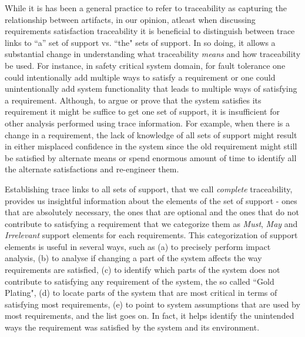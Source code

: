 While it is has been a general practice to refer to traceability as capturing the relationship between artifacts, in our opinion, atleast when discussing requirements satisfaction traceability it is beneficial to distinguish between trace links to ``a'' set of support vs. ``the" sets of support. In so doing, it allows a substantial change in understanding what traceability {\em means} and how traceability be used. For instance, in safety critical system domain, for fault tolerance one could intentionally add multiple ways to satisfy a requirement or one could unintentionally add system functionality that leads to multiple ways of satisfying a requirement. Although, to argue or prove that the system satisfies its requirement it might be suffice to get one set of support, it is insufficient for other analysis performed using trace information. For example, when there is a change in a requirement, the lack of knowledge of all sets of support might result in either misplaced confidence in the system since the old requirement might still be satisfied by alternate means or spend enormous amount of time to identify all the alternate satisfactions and re-engineer them. 

Establishing trace links to all sets of support, that we call \emph{complete} traceability, provides us insightful information about the elements of the set of support - ones that are absolutely necessary, the ones that are optional and the ones that do not contribute to satisfying a requirement that we categorize them as \emph{Must}, \emph{May} and \emph{Irrelevant} support elements for each requirements. This categorization of support elements is useful in several ways, such as (a) to precisely perform impact analysis, (b) to analyse if changing a part of the system affects the way requirements are satisfied, (c) to identify which parts of the system does not contribute to satisfying any requirement of the system, the so called ``Gold Plating", (d) to locate parts of the system that are most critical in terms of satisfying most requirements, (e) to point to system assumptions that are used by most requirements, and the list goes on. In fact, it helps identify the unintended ways the requirement was satisfied by the system and its environment.

